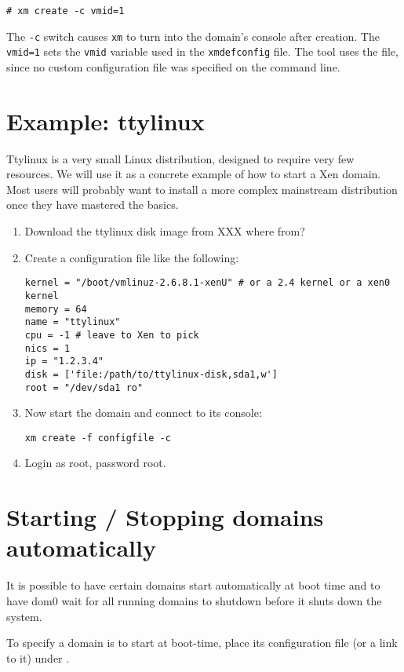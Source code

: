 \documentclass[11pt,twoside,final,openright]{xenstyle}
\begin{document}
\begin{verbatim}
# xm create -c vmid=1
\end{verbatim}

The {\tt -c} switch causes {\tt xm} to turn into the domain's console
after creation.  The {\tt vmid=1} sets the {\tt vmid} variable used in
the {\tt xmdefconfig} file.  The tool uses the
 file, since no custom configuration file
was specified on the command line.

\section{Example: ttylinux}

Ttylinux is a very small Linux distribution, designed to
require very few resources.  We will use it as a concrete example of
how to start a Xen domain.  Most users will probably want to install a
more complex mainstream distribution once they have mastered the
basics.

\begin{enumerate}
\item Download the ttylinux disk image from XXX where from?
\item Create a configuration file like the following:
\begin{verbatim}
kernel = "/boot/vmlinuz-2.6.8.1-xenU" # or a 2.4 kernel or a xen0 kernel
memory = 64
name = "ttylinux"
cpu = -1 # leave to Xen to pick
nics = 1
ip = "1.2.3.4"
disk = ['file:/path/to/ttylinux-disk,sda1,w']
root = "/dev/sda1 ro"
\end{verbatim}
\item Now start the domain and connect to its console:
\begin{verbatim}
xm create -f configfile -c
\end{verbatim}
\item Login as root, password root.
\end{enumerate}

\section{Starting / Stopping domains automatically}

It is possible to have certain domains start automatically at boot
time and to have dom0 wait for all running domains to shutdown before
it shuts down the system.

To specify a domain is to start at boot-time, place its
configuration file (or a link to it) under .
\end{document}

